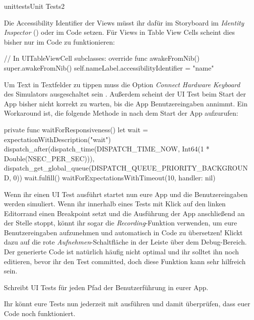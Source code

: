 \documentclass[parskip=half, final]{scrreprt}
\begin{document}
\begin{lecture}
\begin{exc}
\begin{excitem}{unittests}{Unit Tests}{2}
\begin{enumerate}[label=\arabic*.]
Die Accessibility Identifier der Views müsst ihr dafür im Storyboard im \emph{Identity Inspector} () oder im Code setzen. Für Views in Table View Cells scheint dies bisher nur im Code zu funktionieren:
\begin{swiftcode}
    // In UITableViewCell subclasses:
    override func awakeFromNib() {
        super.awakeFromNib()
        self.nameLabel.accessibilityIdentifier = "name"
    }
\end{swiftcode}

Um Text in Textfelder zu tippen muss die Option \emph{Connect Hardware Keyboard} des Simulators ausgeschaltet sein . Außerdem scheint der UI Test beim Start der App bisher nicht korrekt zu warten, bis die App Benutzereingaben annimmt. Ein Workaround ist, die folgende Methode in  nach dem Start der App aufzurufen:
\begin{swiftcode}
    private func waitForResponsiveness() {
        let wait = expectationWithDescription("wait")
        dispatch_after(dispatch_time(DISPATCH_TIME_NOW, Int64(1 * Double(NSEC_PER_SEC))), dispatch_get_global_queue(DISPATCH_QUEUE_PRIORITY_BACKGROUND, 0)) {
            wait.fulfill()
        }
        waitForExpectationsWithTimeout(10, handler: nil)
    }
\end{swiftcode}



Wenn ihr einen UI Test ausführt startet nun eure App und die Benutzereingaben werden simuliert. Wenn ihr innerhalb eines Tests mit Klick auf den linken Editorrand einen Breakpoint setzt und die Ausführung der App anschließend an der Stelle stoppt, könnt ihr sogar die \emph{Recording}-Funktion verwenden, um eure Benutzereingaben aufzunehmen und automatisch in Code zu übersetzen! Klickt dazu auf die rote \emph{Aufnehmen}-Schaltfläche in der Leiste über dem Debug-Bereich. Der generierte Code ist natürlich häufig nicht optimal und ihr solltet ihn noch editieren, bevor ihr den Test committed, doch diese Funktion kann sehr hilfreich sein.

Schreibt UI Tests für jeden Pfad der Benutzerführung in eurer App.
\end{enumerate}

Ihr könnt eure Tests nun jederzeit mit  ausführen und damit überprüfen, dass euer Code noch funktioniert.


\end{excitem}
\end{exc}
\end{lecture}
\end{document}
